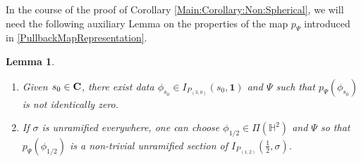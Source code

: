 \documentclass[11pt, reqno]{amsart}
\theoremstyle{plain}
\newtheorem{lemma}[theorem]{Lemma}
\theoremstyle{definition}
\theoremstyle{remark}
\theoremstyle{plain}
\def\C{{\bf C}}
\begin{document}
In the course of the proof of Corollary \ref{Main:Corollary:Non:Spherical}, we will need the following auxiliary Lemma on the properties of the map $p_\Psi$ introduced in \eqref{PullbackMapRepresentation}. 


\begin{lemma}\label{Non:Vanishing:Pullback}
   \leavevmode \begin{enumerate}
       \item Given $s_0 \in \C$, there exist data $\phi_{s_0}\in I_{P_{(3,0)}}(s_0,\mathbf{1})$ and $\Psi$ such that $p_\Psi(\phi_{s_0})$ is not identically zero.
       \item If $\sigma$ is unramified everywhere, one can choose $\phi_{1/2}\in \Pi(\mathbb{H}^2)$ and $\Psi$ so that $p_\Psi(\phi_{1/2})$ is a non-trivial unramified section of $I_{P_{(1,2)}}(\tfrac{1}{2},\sigma)$.
   \end{enumerate} 
\end{lemma}
\end{document}

